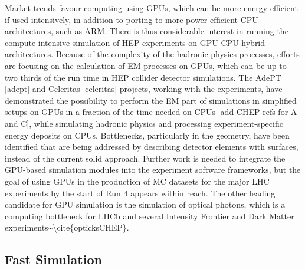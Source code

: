 Market trends favour computing using GPUs, which can be more energy
efficient if used intensively, in addition to porting to more power
efficient CPU architectures, such as ARM. There is thus considerable
interest in running the compute intensive simulation of HEP experiments
on GPU-CPU hybrid architectures. Because of the complexity of the
hadronic physics processes, efforts are focusing on the calculation of
EM processes on GPUs, which can be up to two thirds of the run time in
HEP collider detector simulations. The AdePT {[}adept{]} and Celeritas
{[}celeritas{]} projects, working with the experiments, have
demonstrated the possibility to perform the EM part of simulations in
simplified setups on GPUs in a fraction of the time needed on CPUs
{[}add CHEP refs for A and C{]}, while simulating hadronic physics and
processing experiment-specific energy deposits on CPUs. Bottlenecks,
particularly in the geometry, have been identified that are being
addressed by describing detector elements with surfaces, instead of the
current solid approach. Further work is needed to integrate the
GPU-based simulation modules into the experiment software frameworks,
but the goal of using GPUs in the production of MC datasets for the
major LHC experiments by the start of Run 4 appears within reach. The
other leading candidate for GPU simulation is the simulation of optical
photons, which is a computing bottleneck for LHCb and several Intensity
Frontier and Dark Matter
experiments\textasciitilde\textbackslash cite\{opticksCHEP\}.

\subsection{Fast Simulation}\label{fast-simulation}

